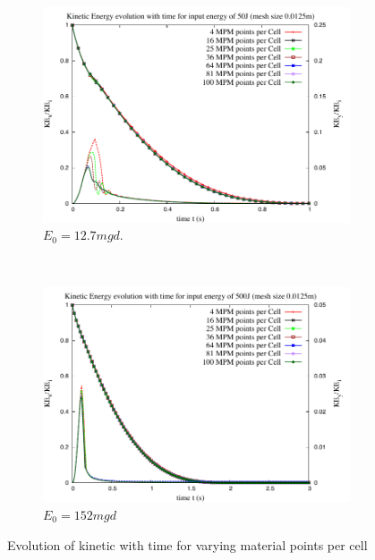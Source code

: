 \begin{figure}[tbhp]
\centering
\begin{subfigure}[b]{0.95\textwidth}
\includegraphics[width=\textwidth]{KE_50}
\caption{$E_0=12.7mgd$.}
\label{fig:KE_50}
\end{subfigure}
\\
\begin{subfigure}[b]{0.95\textwidth}
\centering
\includegraphics[width=\textwidth]{KE_500}
\caption{$E_0=152mgd$}
\label{fig:KE_500}
\end{subfigure}
\caption{Evolution of kinetic with time for varying material points per cell}
\label{fig:KE_MPM}
\end{figure}

